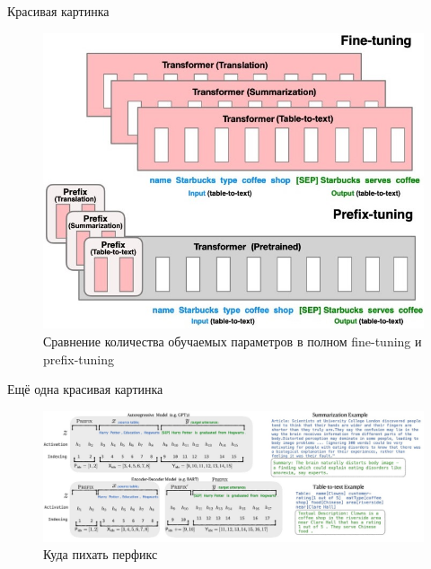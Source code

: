 \documentclass[9pt]{beamer}
\begin{document}
\begin{frame}{Красивая картинка}

    \begin{figure}
        \caption{Сравнение количества обучаемых параметров в полном fine-tuning и prefix-tuning}
        \begin{center}
            \includegraphics[scale=0.5]{images/prefix_1.jpg}
        \end{center}
    \end{figure}

\end{frame}


\begin{frame}{Ещё одна красивая картинка}

    \begin{figure}
        \caption{Куда пихать перфикс}
        \begin{center}
            \includegraphics[scale=0.35]{images/prefix_4.jpg}
        \end{center}
    \end{figure}

\end{frame}
\end{document}
